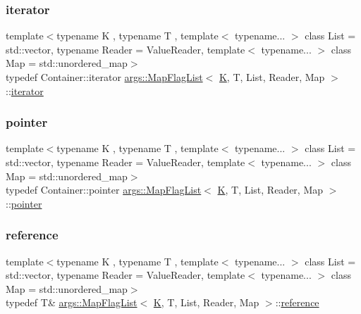 \mbox{\label{classargs_1_1_map_flag_list_a73b7f3d1f8e2dc8776c195c9d1b66d34}} 
\subsubsection{\texorpdfstring{iterator}{iterator}}
{\footnotesize\ttfamily template$<$typename K , typename T , template$<$ typename... $>$ class List = std\+::vector, typename Reader  = Value\+Reader, template$<$ typename... $>$ class Map = std\+::unordered\+\_\+map$>$ \\
typedef Container\+::iterator \hyperlink{classargs_1_1_map_flag_list}{args\+::\+Map\+Flag\+List}$<$ \hyperlink{cgal__test_8cpp_a891e241aa245ae63618f03737efba309}{K}, T, List, Reader, Map $>$\+::\hyperlink{classargs_1_1_map_flag_list_a73b7f3d1f8e2dc8776c195c9d1b66d34}{iterator}}

\mbox{\label{classargs_1_1_map_flag_list_a955d68bb97928f8292c5401810852067}} 
\subsubsection{\texorpdfstring{pointer}{pointer}}
{\footnotesize\ttfamily template$<$typename K , typename T , template$<$ typename... $>$ class List = std\+::vector, typename Reader  = Value\+Reader, template$<$ typename... $>$ class Map = std\+::unordered\+\_\+map$>$ \\
typedef Container\+::pointer \hyperlink{classargs_1_1_map_flag_list}{args\+::\+Map\+Flag\+List}$<$ \hyperlink{cgal__test_8cpp_a891e241aa245ae63618f03737efba309}{K}, T, List, Reader, Map $>$\+::\hyperlink{classargs_1_1_map_flag_list_a955d68bb97928f8292c5401810852067}{pointer}}

\mbox{\label{classargs_1_1_map_flag_list_a64534f886c974afc71a57134e95cab12}} 
\subsubsection{\texorpdfstring{reference}{reference}}
{\footnotesize\ttfamily template$<$typename K , typename T , template$<$ typename... $>$ class List = std\+::vector, typename Reader  = Value\+Reader, template$<$ typename... $>$ class Map = std\+::unordered\+\_\+map$>$ \\
typedef T\& \hyperlink{classargs_1_1_map_flag_list}{args\+::\+Map\+Flag\+List}$<$ \hyperlink{cgal__test_8cpp_a891e241aa245ae63618f03737efba309}{K}, T, List, Reader, Map $>$\+::\hyperlink{classargs_1_1_map_flag_list_a64534f886c974afc71a57134e95cab12}{reference}}

